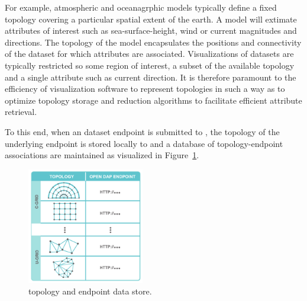 For example, atmospheric and oceanagrphic models typically define a
fixed topology covering a particular spatial extent of the earth. A
model will extimate attributes of interest such as sea-surface-height,
wind or current magnitudes and directions. The topology of the model
encapsulates the positions and connectivity of the dataset for which
attributes are associated. Visualizations of datasets are typically
restricted so some region of interest, a subset of the available
topology and a single attribute such as current direction. It is
therefore paramount to the efficiency of visualization software to
represent topologies in such a way as to optimize topology storage and
reduction algorithms to facilitate efficient attribute retrieval.

To this end, when an dataset endpoint is submitted to \sciwms{}, the
topology of the underlying endpoint is stored locally to \sciwms{} and
a database of topology-endpoint associations are maintained as
visualized in Figure~\ref{fig:sciwms_topology_endpoints}. 

\begin{figure}[ht!]
  \centering
  \includegraphics[height=2in]{../figs/sciwms_book_db_topology_endpoint_chart}
  \caption{\Sciwms{} topology and endpoint data store.}
  \label{fig:sciwms_topology_endpoints}
\end{figure}


